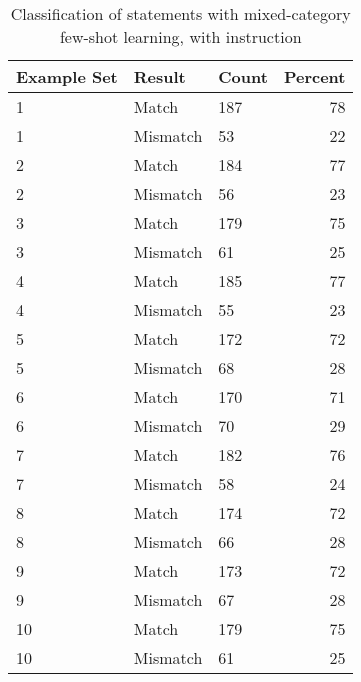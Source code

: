 \documentclass{bmcart}
\begin{document}
\begin{backmatter}
\begin{table}
\caption{\label{tab:fewshotmixedinstruct}Classification of statements with mixed-category few-shot learning, with instruction}
\centering
\begin{tabular}[t]{lllr}
Example Set & Result & Count & Percent\\
\hline
1 & Match & 187 & 78\\
1 & Mismatch & 53 & 22\\
2 & Match & 184 & 77\\
2 & Mismatch & 56 & 23\\
3 & Match & 179 & 75\\
3 & Mismatch & 61 & 25\\
4 & Match & 185 & 77\\
4 & Mismatch & 55 & 23\\
5 & Match & 172 & 72\\
5 & Mismatch & 68 & 28\\
6 & Match & 170 & 71\\
6 & Mismatch & 70 & 29\\
7 & Match & 182 & 76\\
7 & Mismatch & 58 & 24\\
8 & Match & 174 & 72\\
8 & Mismatch & 66 & 28\\
9 & Match & 173 & 72\\
9 & Mismatch & 67 & 28\\
10 & Match & 179 & 75\\
10 & Mismatch & 61 & 25\\
\hline
\end{tabular}
\end{table}







\end{backmatter}
\end{document}
